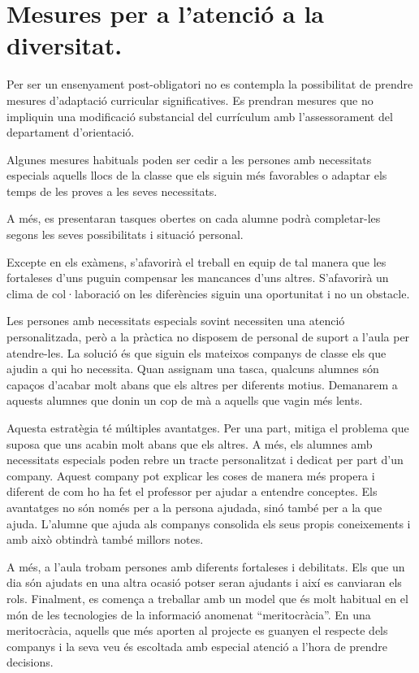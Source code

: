 \documentclass[catalan, a4paper, 12pt, titlepage]{article}
\begin{document}
\section{Mesures per a l'atenció a la diversitat.}
\label{sec:diversitat}

Per ser un ensenyament post-obligatori no es contempla la possibilitat de prendre mesures d'adaptació curricular significatives. Es prendran mesures que no impliquin una modificació substancial del currículum amb l'assessorament del departament d'orientació.

Algunes mesures habituals poden ser cedir a les persones amb necessitats especials aquells llocs de la classe que els siguin més favorables o adaptar els temps de les proves a les seves necessitats.

A més, es presentaran tasques obertes on cada alumne podrà completar-les segons les seves possibilitats i situació personal.

Excepte en els exàmens, s'afavorirà el treball en equip de tal manera que les fortaleses d'uns puguin compensar les mancances d'uns altres. S'afavorirà un clima de col·laboració on les diferències siguin una oportunitat i no un obstacle.

Les persones amb necessitats especials sovint necessiten una atenció personalitzada, però a la pràctica no disposem de personal de suport a l'aula per atendre-les.
La solució és que siguin els mateixos companys de classe els que ajudin a qui ho necessita.
Quan assignam una tasca, qualcuns alumnes són capaços d'acabar molt abans que els altres per diferents motius.
Demanarem a aquests alumnes que donin un cop de mà a aquells que vagin més lents.

Aquesta estratègia té múltiples avantatges. 
Per una part, mitiga el problema que suposa que uns acabin molt abans que els altres.
A més, els alumnes amb necessitats especials poden rebre un tracte personalitzat i dedicat per part d'un company.
Aquest company pot explicar les coses de manera més propera i diferent de com ho ha fet el professor per ajudar a entendre conceptes.
Els avantatges no són només per a la persona ajudada, sinó també per a la que ajuda.
L'alumne que ajuda als companys consolida els seus propis coneixements i amb això obtindrà també millors notes.

A més, a l'aula trobam persones amb diferents fortaleses i debilitats.
Els que un dia són ajudats en una altra ocasió potser seran ajudants i així es canviaran els rols.
Finalment, es comença a treballar amb un model que és molt habitual en el món de les tecnologies de la informació anomenat ``meritocràcia''.
En una meritocràcia, aquells que més aporten al projecte es guanyen el respecte dels companys i la seva veu és escoltada amb especial atenció a l'hora de prendre decisions.
\end{document}
